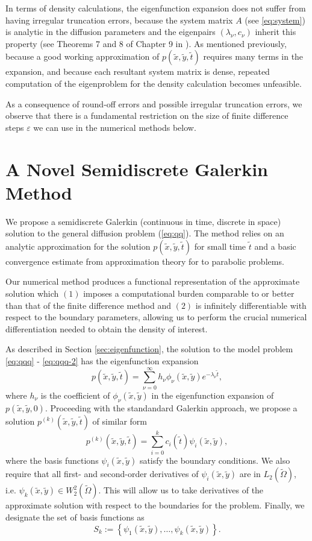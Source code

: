 In terms of density calculations, the eigenfunction expansion does not
suffer from having irregular truncation errors, because the system
matrix $A$ (see \eqref{eq:system}) is analytic in the diffusion
parameters and the eigenpairs $(\lambda_\nu, c_\nu)$ inherit this
property (see Theorems 7 and 8 of Chapter 9 in
\cite{lax2007linear-algebra}). As mentioned previously, because a good
working approximation of $p(\tilde{x},\tilde{y},\tilde{t})$ requires
many terms in the expansion, and because each resultant system matrix
is dense, repeated computation of the eigenproblem for the density
calculation becomes unfeasible.

As a consequence of round-off errors and possible irregular truncation
errors, we observe that there is a fundamental restriction on the size
of finite difference steps $\varepsilon$ we can use in the numerical
methods below.

\section{A Novel Semidiscrete Galerkin
  Method} \label{sec:semidiscrete-galerkin} We propose a semidiscrete
Galerkin (continuous in time, discrete in space) solution to the
general diffusion problem (\ref{eq:qq}). The method relies on an
analytic approximation for the solution
$p(\tilde{x},\tilde{y},\tilde{t})$ for small time $\tilde{t}$ and a
basic convergence estimate from approximation theory for to parabolic
problems.

Our numerical method produces a functional representation of the
approximate solution which $(1)$ imposes a computational burden
comparable to or better than that of the finite difference method and
$(2)$ is infinitely differentiable with respect to the boundary
parameters, allowing us to perform the crucial numerical
differentiation needed to obtain the density of interest.

As described in Section \ref{sec:eigenfunction}, the solution to the
model problem \eqref{eq:qqq} - \eqref{eq:qqq-2} has the eigenfunction
expansion
\[
  p(\tilde{x},\tilde{y},\tilde{t}) = \sum_{\nu=0}^\infty h_\nu
  \phi_\nu(\tilde{x},\tilde{y}) e^{-\lambda_\nu \tilde{t}},
\]
where $h_\nu$ is the coefficient of $\phi_\nu(\tilde{x},\tilde{y})$ in the
eigenfunction expansion of $p(\tilde{x},\tilde{y},0)$. Proceeding with the standandard
Galerkin approach, we propose a solution $p^{(k)}(\tilde{x},\tilde{y},\tilde{t})$ of similar
form
\[
  p^{(k)}(\tilde{x},\tilde{y},\tilde{t}) = \sum_{i=0}^k c_i(\tilde{t})
  \psi_i(\tilde{x},\tilde{y}),
\]
where the basis functions $\psi_i(\tilde{x},\tilde{y})$ satisfy the
boundary conditions. We also require that all first- and second-order
derivatives of $\psi_i(\tilde{x},\tilde{y})$ are in
$L_2(\tilde{\Omega})$, i.e.
$\psi_k(\tilde{x},\tilde{y}) \in W_{2}^{2}(\tilde{\Omega})$. This will
allow us to take derivatives of the approximate solution with respect
to the boundaries for the problem. Finally, we designate the set of
basis functions as
\[
  S_k := \left\{ \psi_1(\tilde{x},\tilde{y}), \ldots, \psi_k(\tilde{x},\tilde{y}) \right\}.
\]

